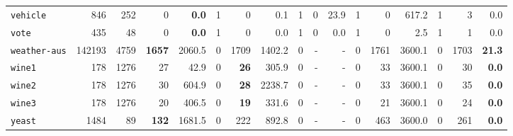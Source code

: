 \begin{tabular}{lccrrrrrrrrrrrrrr}
\texttt{vehicle} & \multicolumn{1}{r}{846} & \multicolumn{1}{r}{252}  & 0 & \textbf{0.0} & 1 & 0 & 0.1 & 1 & 0 & 23.9 & 1 & 0 & 617.2 & 1 & 3 & 0.0\\
\texttt{vote} & \multicolumn{1}{r}{435} & \multicolumn{1}{r}{48}  & 0 & \textbf{0.0} & 1 & 0 & 0.0 & 1 & 0 & 0.0 & 1 & 0 & 2.5 & 1 & 1 & 0.0\\
\texttt{weather-aus} & \multicolumn{1}{r}{142193} & \multicolumn{1}{r}{4759}  & \textbf{1657} & 2060.5 & 0 & 1709 & 1402.2 & 0 & - & - & 0 & 1761 & 3600.1 & 0 & 1703 & \textbf{21.3}\\
\texttt{wine1} & \multicolumn{1}{r}{178} & \multicolumn{1}{r}{1276}  & 27 & 42.9 & 0 & \textbf{26} & 305.9 & 0 & - & - & 0 & 33 & 3600.1 & 0 & 30 & \textbf{0.0}\\
\texttt{wine2} & \multicolumn{1}{r}{178} & \multicolumn{1}{r}{1276}  & 30 & 604.9 & 0 & \textbf{28} & 2238.7 & 0 & - & - & 0 & 33 & 3600.1 & 0 & 35 & \textbf{0.0}\\
\texttt{wine3} & \multicolumn{1}{r}{178} & \multicolumn{1}{r}{1276}  & 20 & 406.5 & 0 & \textbf{19} & 331.6 & 0 & - & - & 0 & 21 & 3600.1 & 0 & 24 & \textbf{0.0}\\
\texttt{yeast} & \multicolumn{1}{r}{1484} & \multicolumn{1}{r}{89}  & \textbf{132} & 1681.5 & 0 & 222 & 892.8 & 0 & - & - & 0 & 463 & 3600.0 & 0 & 261 & \textbf{0.0}\\
\bottomrule
\end{tabular}
